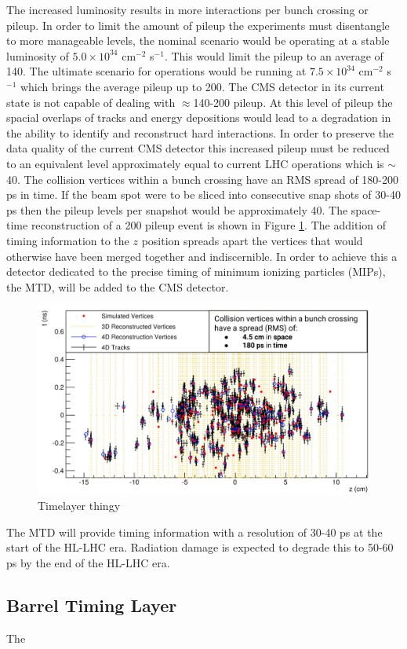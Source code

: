 The increased luminosity results in more interactions per bunch crossing or pileup.  In order to limit the amount of pileup the experiments must disentangle to more manageable levels, the nominal scenario would be operating at a stable luminosity of $5.0\times10^{34}$ cm$^{-2}$ s$^{-1}$.  This would limit the pileup to an average of 140.  The ultimate scenario for operations would be running at $7.5\times10^{34}$ cm$^{-2}$ s$^{-1}$ which brings the average pileup up to 200.  The CMS detector in its current state is not capable of dealing with $\approx$140-200 pileup.  At this level of pileup the spacial overlaps of tracks and energy depositions would lead to a degradation in the ability to identify and reconstruct hard interactions. In order to preserve the data quality of the current CMS detector this increased pileup must be reduced to an equivalent level approximately equal to current LHC operations which is $\sim$40.  The collision vertices within a bunch crossing have an RMS spread of 180-200 ps in time.  If the beam spot were to be sliced into consecutive snap shots of 30-40 ps then the pileup levels per snapshot would be approximately 40.  The space-time reconstruction of a 200 pileup event is shown in Figure \ref{fig:pileup4d}.  The addition of timing information to the $z$ position spreads apart the vertices that would otherwise have been merged together and indiscernible.  In order to achieve this a detector dedicated to the precise timing of minimum ionizing particles (MIPs), the MTD, will be added to the CMS detector.



\begin{figure}[h]
	\centering
	\includegraphics[width=0.7\linewidth]{Figures/Pileup_4D}
	\caption{Timelayer thingy}
	\label{fig:pileup4d}
\end{figure}



The MTD will provide timing information with a resolution of 30-40 ps at the start of the HL-LHC era.  Radiation damage is expected to degrade this to 50-60 ps by the end of the HL-LHC era.


\subsection{Barrel Timing Layer}
The 


